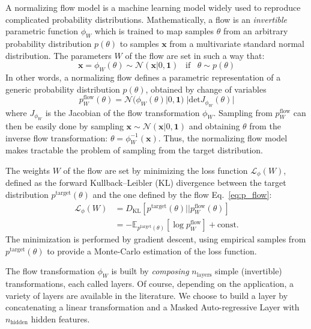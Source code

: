 \documentclass[twocolumn,showpacs,preprintnumbers,nofootinbib,prd,
superscriptaddress,10pt]{revtex4-2}
\begin{document}
A normalizing flow model \cite{norm_flow, nflows_paper, Kobyzev_2021, Papamakarios_thesis} is a machine learning model widely used to reproduce complicated probability distributions.
Mathematically, a flow is an {\it invertible} parametric function $\phi_W$ which is trained to map samples $\theta$ from an arbitrary probability distribution $p(\theta)$ to samples $\mathbf{x}$ from a multivariate standard normal distribution.
The parameters $W$ of the flow are set in such a way that:
\begin{equation}
	\mathbf{x} = \phi_W(\theta) \sim \mathcal{N}(\mathbf{x}|0,\mathbf{1}) \;\;\; \text{if} \;\;\;  \theta \sim p(\theta)
\end{equation}
%
In other words, a normalizing flow defines a parametric representation of a generic probability distribution $p(\theta)$, obtained by change of variables
\begin{equation}\label{eq:p_flow}
	p^\text{flow}_W(\theta) = \mathcal{N}(\phi_W(\theta)|0,\mathbf{1}) \; |\text{det} J_{\phi_W}(\theta)|
\end{equation}
where $J_{\phi_W}$ is the Jacobian of the flow transformation $\phi_W$.
Sampling from $p^\text{flow}_W$ can then be easily done by sampling $\mathbf{x} \sim \mathcal{N}(\mathbf{x}|0,\mathbf{1})$ and obtaining $\theta$ from the inverse flow transformation: $\theta = \phi_W^{-1}(\mathbf{x})$.
Thus, the normalizing flow model makes tractable the problem of sampling from the target distribution.

The weights $W$ of the flow are set by minimizing the loss function $\mathcal{L}_\phi(W)$, defined as the forward Kullback–Leibler (KL) divergence between the target distribution $p^\text{target}(\theta)$ and the one defined by the flow Eq.~\eqref{eq:p_flow}:
\begin{align}
	\mathcal{L}_\phi(W) 	&= D_{\text{KL}}[p^\text{target}(\theta) || p^\text{flow}_W(\theta)] \nonumber \\
					&= - \mathbb{E}_{p^\text{target}(\theta)} [\log p^\text{flow}_W] + \text{const.}
\end{align}
The minimization is performed by gradient descent, using empirical samples from $p^\text{target}(\theta)$ to provide a Monte-Carlo estimation of the loss function.

The flow transformation $\phi_W$ is built by {\it composing} $n_\text{layers}$ simple (invertible) transformations, each called layers. Of course, depending on the application, a variety of layers are available in the literature. We choose to build a layer by concatenating a linear transformation and a Masked Auto-regressive Layer \cite{MADE, MAF,MAF_bis} with $n_\text{hidden}$ hidden features.
\end{document}

